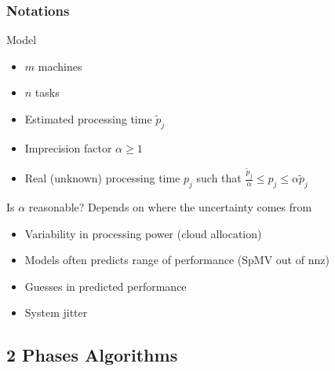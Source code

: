 \documentclass[usenames,dvipsnames]{beamer}
\begin{document}
\begin{frame}
  \frametitle{Notations}

  \begin{block}{Model}
    \begin{itemize}
    \item $m$ machines
    \item $n$ tasks
    \item Estimated processing time $\tilde{p}_j$
    \item Imprecision factor $\alpha \geq 1$
    \item Real (unknown) processing time $p_j$ such that $\frac{\tilde{p}_{j}}{\alpha}\leq p_{j}\leq \alpha \tilde{p}_{j}$
    \end{itemize}
  \end{block}
  
  \begin{block}{Is $\alpha$ reasonable?}
    Depends on where the uncertainty comes from
    \begin{itemize}
    \item Variability in processing power (cloud allocation)
    \item Models often predicts range of performance (SpMV out of nnz)
    \item Guesses in predicted performance
    \item System jitter
    \end{itemize}
  \end{block}
  
\end{frame}

\subsection{2 Phases Algorithms}
\end{document}
